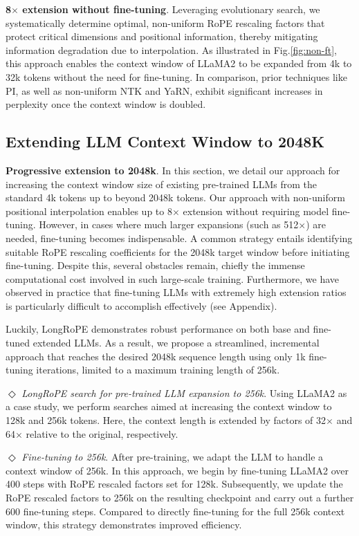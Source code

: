 \textbf{8$\times$ extension without fine-tuning}. Leveraging evolutionary search, we systematically determine optimal, non-uniform RoPE rescaling factors that protect critical dimensions and positional information, thereby mitigating information degradation due to interpolation. As illustrated in Fig.\ref{fig:non-ft}, this approach enables the context window of LLaMA2 to be expanded from 4k to 32k tokens without the need for fine-tuning. In comparison, prior techniques like PI, as well as non-uniform NTK and YaRN, exhibit significant increases in perplexity once the context window is doubled.

\subsection{Extending LLM Context Window to 2048K}
\label{sec:extendto2048k}

\textbf{Progressive extension to 2048k}. In this section, we detail our approach for increasing the context window size of existing pre-trained LLMs from the standard 4k tokens up to beyond 2048k tokens. Our approach with non-uniform positional interpolation enables up to 8$\times$ extension without requiring model fine-tuning. However, in cases where much larger expansions (such as 512$\times$) are needed, fine-tuning becomes indispensable. A common strategy entails identifying suitable RoPE rescaling coefficients for the 2048k target window before initiating fine-tuning. Despite this, several obstacles remain, chiefly the immense computational cost involved in such large-scale training. Furthermore, we have observed in practice that fine-tuning LLMs with extremely high extension ratios is particularly difficult to accomplish effectively (see Appendix).

Luckily, LongRoPE demonstrates robust performance on both base and fine-tuned extended LLMs. As a result, we propose a streamlined, incremental approach that reaches the desired 2048k sequence length using only 1k fine-tuning iterations, limited to a maximum training length of 256k.

$\Diamond$ \textit{LongRoPE search for pre-trained LLM expansion to 256k}. Using LLaMA2 as a case study, we perform searches aimed at increasing the context window to 128k and 256k tokens. Here, the context length is extended by factors of 32$\times$ and 64$\times$ relative to the original, respectively.

$\Diamond$ \textit{Fine-tuning to 256k}. After pre-training, we adapt the LLM to handle a context window of 256k. In this approach, we begin by fine-tuning LLaMA2 over 400 steps with RoPE rescaled factors set for 128k. Subsequently, we update the RoPE rescaled factors to 256k on the resulting checkpoint and carry out a further 600 fine-tuning steps. Compared to directly fine-tuning for the full 256k context window, this strategy demonstrates improved efficiency.

